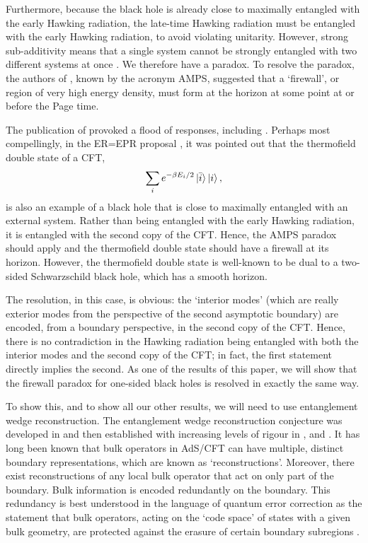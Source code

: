 \documentclass[11pt,a4paper]{article}
\begin{document}
Furthermore, because the black hole is already close to maximally entangled with the early Hawking radiation, the late-time Hawking radiation must be entangled with the early Hawking radiation, to avoid violating unitarity. However, strong sub-additivity means that a single system cannot be strongly entangled with two different systems at once \cite{lieb1973proof}. We therefore have a paradox. To resolve the paradox, the authors of \cite{almheiri2013black}, known by the acronym AMPS, suggested that a `firewall', or region of very high energy density, must form at the horizon at some point at or before the Page time.

The publication of \cite{almheiri2013black} provoked a flood of responses, including \cite{nomura2013complementarity, bousso2013complementarity, susskind2012singularities, verlinde2013black, susskind2012transfer, harlow2013quantum}. Perhaps most compellingly, in the ER=EPR proposal \cite{maldacena2013cool}, it was pointed out that the thermofield double state of a CFT,
\begin{align}
\sum_i e^{- \beta E_i / 2} \ket{\bar{i}} \ket{i},
\end{align}
is also an example of a black hole that is close to maximally entangled with an external system. Rather than being entangled with the early Hawking radiation, it is entangled with the second copy of the CFT. Hence, the AMPS paradox should apply and the thermofield double state should have a firewall at its horizon. However, the thermofield double state is well-known to be dual to a two-sided Schwarzschild black hole, which has a smooth horizon. 

The resolution, in this case, is obvious: the `interior modes' (which are really exterior modes from the perspective of the second asymptotic boundary) are encoded, from a boundary perspective, in the second copy of the CFT. Hence, there is no contradiction in the Hawking radiation being entangled with both the interior modes and the second copy of the CFT; in fact, the first statement directly implies the second. As one of the results of this paper, we will show that the firewall paradox for one-sided black holes is resolved in exactly the same way. 

To show this, and to show all our other results, we will need to use entanglement wedge reconstruction. The entanglement wedge reconstruction conjecture was developed in \cite{czech2012gravity, headrick2014causality, wall2014maximin} and then established with increasing levels of rigour in \cite{jafferis2016relative}, \cite{dong2016reconstruction} and \cite{cotler2017entanglement}. It has long been known that bulk operators in AdS/CFT can have multiple, distinct boundary representations, which are known as `reconstructions'. Moreover, there exist reconstructions of any local bulk operator that act on only part of the boundary. Bulk information  is encoded redundantly on the boundary. This redundancy is best understood in the language of quantum error correction as the statement that bulk operators, acting on the `code space' of states with a given bulk geometry, are protected against the erasure of certain boundary subregions \cite{almheiri2015bulk}. 
\end{document}
